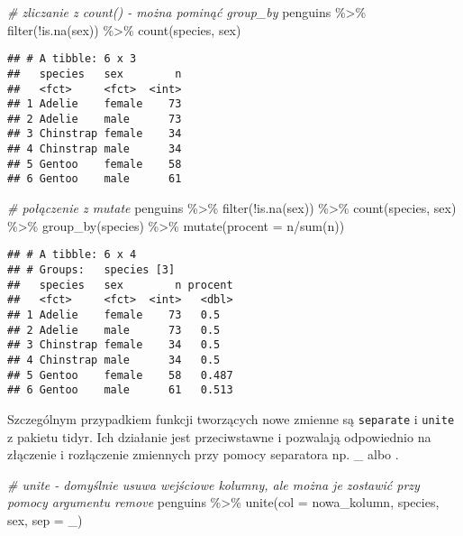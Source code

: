 \documentclass[
]{book}
\newenvironment{Shaded}{\begin{snugshade}}{\end{snugshade}}
\newcommand{\AttributeTok}[1]{\textcolor[rgb]{0.77,0.63,0.00}{#1}}
\newcommand{\CommentTok}[1]{\textcolor[rgb]{0.56,0.35,0.01}{\textit{#1}}}
\newcommand{\FunctionTok}[1]{\textcolor[rgb]{0.00,0.00,0.00}{#1}}
\newcommand{\NormalTok}[1]{#1}
\newcommand{\SpecialCharTok}[1]{\textcolor[rgb]{0.00,0.00,0.00}{#1}}
\newcommand{\StringTok}[1]{\textcolor[rgb]{0.31,0.60,0.02}{#1}}
\begin{document}
\begin{Shaded}
\begin{Highlighting}[]
\CommentTok{\# zliczanie z count() {-} można pominąć group\_by}
\NormalTok{penguins }\SpecialCharTok{\%\textgreater{}\%} \FunctionTok{filter}\NormalTok{(}\SpecialCharTok{!}\FunctionTok{is.na}\NormalTok{(sex)) }\SpecialCharTok{\%\textgreater{}\%}
  \FunctionTok{count}\NormalTok{(species, sex)}
\end{Highlighting}
\end{Shaded}

\begin{verbatim}
## # A tibble: 6 x 3
##   species   sex        n
##   <fct>     <fct>  <int>
## 1 Adelie    female    73
## 2 Adelie    male      73
## 3 Chinstrap female    34
## 4 Chinstrap male      34
## 5 Gentoo    female    58
## 6 Gentoo    male      61
\end{verbatim}

\begin{Shaded}
\begin{Highlighting}[]
\CommentTok{\# połączenie z mutate}
\NormalTok{penguins }\SpecialCharTok{\%\textgreater{}\%} \FunctionTok{filter}\NormalTok{(}\SpecialCharTok{!}\FunctionTok{is.na}\NormalTok{(sex)) }\SpecialCharTok{\%\textgreater{}\%} 
  \FunctionTok{count}\NormalTok{(species, sex) }\SpecialCharTok{\%\textgreater{}\%}
  \FunctionTok{group\_by}\NormalTok{(species) }\SpecialCharTok{\%\textgreater{}\%}
  \FunctionTok{mutate}\NormalTok{(}\AttributeTok{procent =}\NormalTok{ n}\SpecialCharTok{/}\FunctionTok{sum}\NormalTok{(n))}
\end{Highlighting}
\end{Shaded}

\begin{verbatim}
## # A tibble: 6 x 4
## # Groups:   species [3]
##   species   sex        n procent
##   <fct>     <fct>  <int>   <dbl>
## 1 Adelie    female    73   0.5  
## 2 Adelie    male      73   0.5  
## 3 Chinstrap female    34   0.5  
## 4 Chinstrap male      34   0.5  
## 5 Gentoo    female    58   0.487
## 6 Gentoo    male      61   0.513
\end{verbatim}

Szczególnym przypadkiem funkcji tworzących nowe zmienne są \texttt{separate} i \texttt{unite} z pakietu tidyr. Ich działanie jest przeciwstawne i pozwalają odpowiednio na złączenie i rozłączenie zmiennych przy pomocy separatora np. \_ albo .

\begin{Shaded}
\begin{Highlighting}[]
\CommentTok{\# unite {-} domyślnie usuwa wejściowe kolumny, ale można je zostawić przy pomocy argumentu remove}
\NormalTok{penguins }\SpecialCharTok{\%\textgreater{}\%} \FunctionTok{unite}\NormalTok{(}\AttributeTok{col =}\NormalTok{ nowa\_kolumn, species, sex, }\AttributeTok{sep =} \StringTok{\textquotesingle{}\_\textquotesingle{}}\NormalTok{)}
\end{Highlighting}
\end{Shaded}
\end{document}
